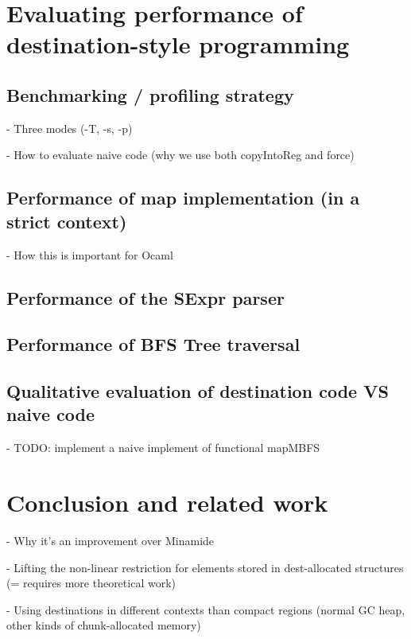 \documentclass[english]{jflart}
\begin{document}
\section{Evaluating performance of destination-style programming}

\subsection{Benchmarking / profiling strategy}

- Three modes (-T, -s, -p)

- How to evaluate naive code (why we use both copyIntoReg and force)

\subsection{Performance of map implementation (in a strict context)}

- How this is important for Ocaml

\subsection{Performance of the SExpr parser}

\subsection{Performance of BFS Tree traversal}

\subsection{Qualitative evaluation of destination code VS naive code}

- TODO: implement a naive implement of functional mapMBFS

\section{Conclusion and related work}

- Why it's an improvement over Minamide

- Lifting the non-linear restriction for elements stored in dest-allocated structures (= requires more theoretical work)

- Using destinations in different contexts than compact regions (normal GC heap, other kinds of chunk-allocated memory)

\printbibliography
\end{document}
